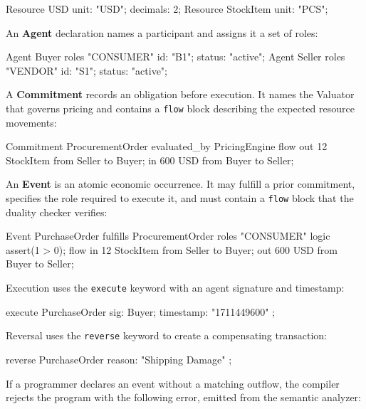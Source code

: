 \documentclass[11pt,a4paper]{article}
\theoremstyle{remark}
\begin{document}
\begin{equiscode}
Resource USD       { unit: "USD"; decimals: 2; }
Resource StockItem { unit: "PCS"; }
\end{equiscode}

An \textbf{Agent} declaration names a participant and assigns it a set
of roles:

\begin{equiscode}
Agent Buyer  roles { "CONSUMER" } { id: "B1"; status: "active"; }
Agent Seller roles { "VENDOR"   } { id: "S1"; status: "active"; }
\end{equiscode}

A \textbf{Commitment} records an obligation before execution. It names
the Valuator that governs pricing and contains a \texttt{flow} block
describing the expected resource movements:

\begin{equiscode}
Commitment ProcurementOrder evaluated_by PricingEngine {
    flow {
        out 12 StockItem from Seller to Buyer;
        in  600 USD from Buyer to Seller;
    }
}
\end{equiscode}

An \textbf{Event} is an atomic economic occurrence. It may fulfill a
prior commitment, specifies the role required to execute it, and must
contain a \texttt{flow} block that the duality checker verifies:

\begin{equiscode}
Event PurchaseOrder fulfills ProcurementOrder roles { "CONSUMER" } {
    logic {
        assert(1 > 0);
    }
    flow {
        in  12 StockItem from Seller to Buyer;
        out 600 USD from Buyer to Seller;
    }
}
\end{equiscode}

Execution uses the \texttt{execute} keyword with an agent signature and
timestamp:

\begin{equiscode}
execute PurchaseOrder { sig: Buyer; timestamp: "1711449600" };
\end{equiscode}

Reversal uses the \texttt{reverse} keyword to create a compensating
transaction:

\begin{equiscode}
reverse PurchaseOrder { reason: "Shipping Damage" };
\end{equiscode}

If a programmer declares an event without a matching outflow, the
compiler rejects the program with the following error, emitted from the
semantic analyzer:
\end{document}
